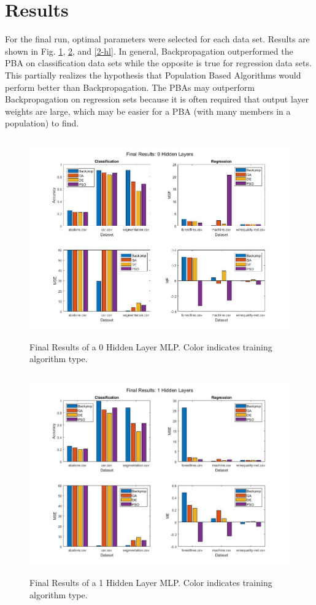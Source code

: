 \documentclass[twoside,11pt]{article}
\begin{document}
\section{Results}

	For the final run, optimal parameters were selected for each data set. 
	Results are shown in Fig. \ref{0-hl}, \ref{1-hl}, and \ref{2-hl}. 
	In general, Backpropagation outperformed the PBA on classification data sets while the opposite is true for regression data sets. 
	This partially realizes the hypothesis that Population Based Algorithms would perform better than Backpropagation. 
	The PBAs may outperform Backpropagation on regression sets because it is often required that output layer weights are large, which may be easier for a PBA (with many members in a population) to find.

	\begin{figure}[h]
		\centering
		\includegraphics[height=3.4in]{FINAL_FIGS/0_hl.jpg}
		\caption{Final Results of a 0 Hidden Layer MLP. Color indicates training algorithm type.}
		\label{0-hl}
	\end{figure}
	
	\begin{figure}[h]
		\centering
		\includegraphics[height=3.4in]{FINAL_FIGS/1_hl.jpg}
		\caption{Final Results of a 1 Hidden Layer MLP. Color indicates training algorithm type.}
		\label{1-hl}
	\end{figure}
	
\end{document}
